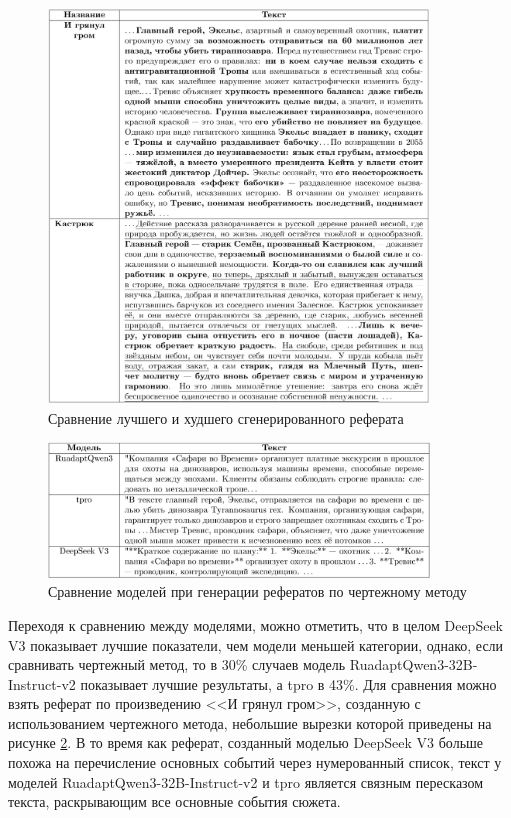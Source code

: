 \documentclass{superfri}
\begin{document}
\begin{figure}[ht!]
  \centering
  \includegraphics[width=0.9\textwidth]{figures/two_ref.png}
  \caption{Сравнение лучшего и худшего сгенерированного реферата}
  \label{fig:refs}
\end{figure}

\begin{figure}[ht!]
  \centering
  \includegraphics[width=0.9\textwidth]{figures/three_ref.png}
  \caption{Сравнение моделей при генерации рефератов по чертежному методу}
  \label{fig:bl_ref}
\end{figure}

Переходя к сравнению между моделями, можно отметить, что в целом DeepSeek V3 показывает лучшие показатели, чем модели меньшей категории, однако, если сравнивать чертежный метод, то в 30\% случаев модель 
RuadaptQwen3-\allowbreak 32B-\allowbreak Instruct-\allowbreak v2 показывает лучшие результаты, а tpro в 43\%. Для сравнения можно взять реферат по произведению <<И грянул гром>>, созданную с использованием чертежного метода, 
небольшие вырезки которой приведены на рисунке \ref{fig:bl_ref}.
В то время как реферат, созданный моделью DeepSeek V3 больше похожа на перечисление основных событий через нумерованный список,
текст у моделей RuadaptQwen3-\allowbreak 32B-\allowbreak Instruct-\allowbreak v2 и tpro является связным пересказом текста, раскрывающим все основные события сюжета.
\end{document}
